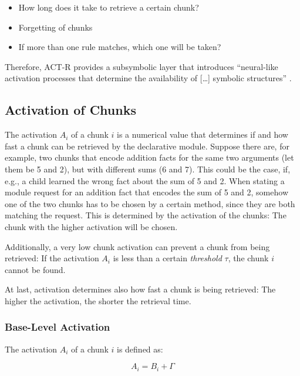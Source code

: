\begin{itemize}
\item How long does it take to retrieve a certain chunk? 
\item Forgetting of chunks
\item If more than one rule matches, which one will be taken?
\end{itemize}

Therefore, ACT-R provides a subsymbolic layer that introduces ``neural-like activation processes that determine the availability of [\dots] symbolic structures'' \cite{anderson_implications_2000}.

\subsection{Activation of Chunks}
\label{activation}

The activation $A_i$ of a chunk $i$ is a numerical value that determines if and how fast a chunk can be retrieved by the declarative module. Suppose there are, for example, two chunks that encode addition facts for the same two arguments (let them be 5 and 2), but with different sums (6 and 7). This could be the case, if, e.g., a child learned the wrong fact about the sum of 5 and 2. When stating a module request for an addition fact that encodes the sum of 5 and 2, somehow one of the two chunks has to be chosen by a certain method, since they are both matching the request. This is determined by the activation of the chunks: The chunk with the higher activation will be chosen.

Additionally, a very low chunk activation can prevent a chunk from being retrieved: If the activation $A_i$ is less than a certain \emph{threshold} $\tau$, the chunk $i$ cannot be found.

At last, activation determines also how fast a chunk is being retrieved: The higher the activation, the shorter the retrieval time.

\subsubsection{Base-Level Activation}
\label{base_level_activation}

The activation $A_i$ of a chunk $i$ is defined as:

\begin{equation}
 \label{eq:activation_equation_simpl}
 A_i = B_i + \Gamma
\end{equation}

